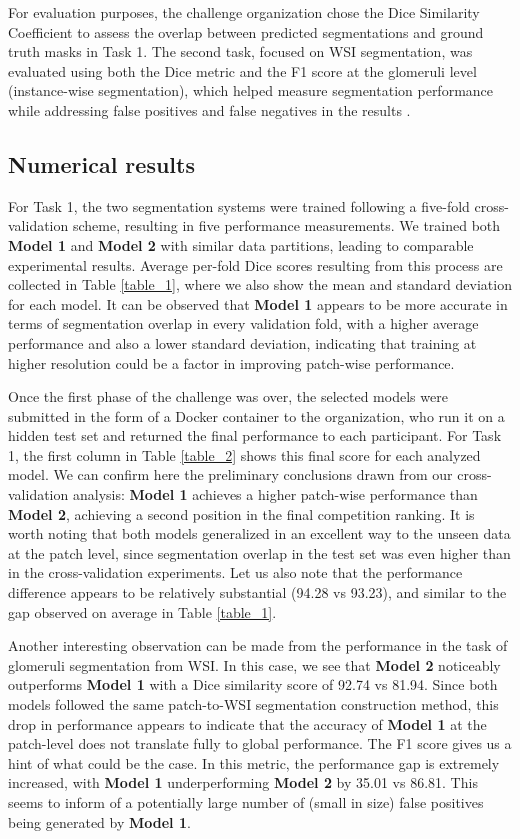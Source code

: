 For evaluation purposes, the challenge organization chose the Dice Similarity Coefficient to assess the overlap between predicted segmentations and ground truth masks in Task 1. 
The second task, focused on WSI segmentation, was evaluated using both the Dice metric and the F1 score at the glomeruli level (instance-wise segmentation), which helped measure segmentation performance while addressing false positives and false negatives in the results \cite{reinke_understanding_2024}.


\subsection{Numerical results}
For Task 1, the two segmentation systems were trained following a five-fold cross-validation scheme, resulting in five performance measurements. 
We trained both \textbf{Model 1} and \textbf{Model 2} with similar data partitions, leading to comparable experimental results. 
Average per-fold Dice scores resulting from this process are collected in Table \ref{table_1}, where we also show the mean and standard deviation for each model.
It can be observed that \textbf{Model 1} appears to be more accurate in terms of segmentation overlap in every validation fold, with a higher average performance and also a lower standard deviation, indicating that training at higher resolution could be a factor in improving patch-wise performance.

\newpage

Once the first phase of the challenge was over, the selected models were submitted in the form of a Docker container to the organization, who run it on a hidden test set and returned the final performance to each participant. For Task 1, the first column in Table \ref{table_2} shows this final score for each analyzed model. 
We can confirm here the preliminary conclusions drawn from our cross-validation analysis: \textbf{Model 1} achieves a higher patch-wise performance than \textbf{Model 2}, achieving a second position in the final competition ranking. 
It is worth noting that both models generalized in an excellent way to the unseen data at the patch level, since segmentation overlap in the test set was even higher than in the cross-validation experiments. 
Let us also note that the performance difference appears to be relatively substantial (94.28 vs 93.23), and similar to the gap observed on average in Table \ref{table_1}.

Another interesting observation can be made from the performance in the task of glomeruli segmentation from WSI. 
In this case, we see that \textbf{Model 2} noticeably outperforms \textbf{Model 1} with a Dice similarity score of 92.74 vs 81.94. 
Since both models followed the same patch-to-WSI segmentation construction method, this drop in performance appears to indicate that the accuracy of \textbf{Model 1} at the patch-level does not translate fully to global performance.
The F1 score gives us a hint of what could be the case. 
In this metric, the performance gap is extremely increased, with \textbf{Model 1} underperforming \textbf{Model 2} by 35.01 vs 86.81. 
This seems to inform of a potentially large number of (small in size) false positives being generated by \textbf{Model 1}.


